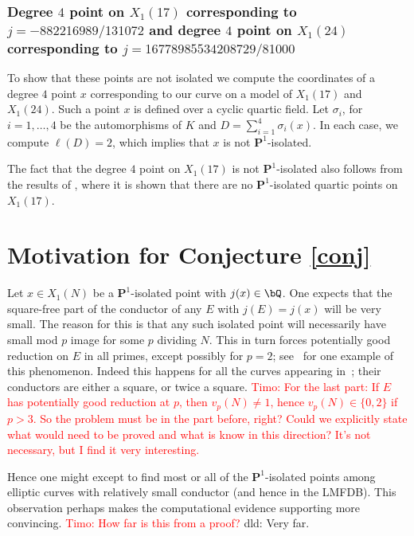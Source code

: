 \documentclass[11pt,reqno]{amsart}
\theoremstyle{plain}
\theoremstyle{definition}
\newcommand{\Q}{\bQ}
\newcommand{\PP}{\mathbf P}
\newcommand{\dld}[1]{\textcolor{VioletRed}{dld: #1}}
\newcommand{\timo}[1]{\textcolor{red}{Timo: #1}}
\begin{document}
\subsubsection{Degree $4$ point on $X_1(17)$ corresponding to $j=-882216989/131072$ and degree $4$ point on $X_1(24)$ corresponding to $j=16778985534208729/81000$ }
To show that these points are not isolated we compute the coordinates of a degree $4$ point $x$ corresponding to our curve on a model of $X_1(17)$ and $X_1(24)$. Such a point $x$ is defined over a cyclic quartic field. Let $\sigma_i$, for $i=1,\ldots, 4$ be the automorphisms of $K$ and $D=\sum_{i=1}^4\sigma_i(x)$. In each case, we compute $\ell(D)=2$, which implies that $x$ is not $\PP^1$-isolated.

The fact that the degree $4$ point on $X_1(17)$ is not $\PP^1$-isolated also follows from the results of \cite[Proposition 6.7]{DerickxMazurKamienny}, where it is shown that there are no $\PP^1$-isolated quartic points on $X_1(17)$.

\section{Motivation for Conjecture \ref{conj}}\label{conj_motivation}
Let $x\in X_1(N)$ be a $\PP^1$-isolated point with $j(x) \in \Q$. One expects that the square-free part of the conductor of any $E$ with $j(E) = j(x)$ will be very small.  The reason for this is that any such isolated point will necessarily have small mod $p$ image for some $p$ dividing $N$. This in turn forces potentially good reduction on $E$ in all primes, except possibly for $p=2$; see~\cite[Corollary 4.4]{Mazur1978} for one example of this phenomenon. Indeed this happens for all the curves appearing in~; their conductors are either a square, or twice a square. \timo{For the last part: If $E$ has potentially good reduction at $p$, then $v_p(N) \neq 1$, hence $v_p(N) \in \{0,2\}$ if $p > 3$. So the problem must be in the part before, right? Could we explicitly state what would need to be proved and what is know in this direction? It's not necessary, but I find it very interesting.}

Hence one might except to find most or all of the $\PP^1$-isolated points among elliptic curves with relatively small conductor (and hence in the LMFDB). This observation perhaps makes the computational evidence supporting  more convincing. \timo{How far is this from a proof?} \dld{Very far.} 


\newpage
\end{document}
